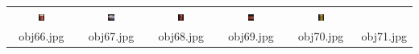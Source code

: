 \begin{table}[H]
\begin{tabu}{|cccccc|}
    \includegraphics[width=0.1\textwidth,height=0.1\textwidth]{imagens/coil_100/embalagens_cilindricas/obj71__0.png} &
    \includegraphics[width=0.1\textwidth,height=0.1\textwidth]{imagens/coil_100/embalagens_cilindricas/obj87__0.png} &
    \includegraphics[width=0.1\textwidth,height=0.1\textwidth]{imagens/coil_100/embalagens_cilindricas/obj93__0.png} &
    \includegraphics[width=0.1\textwidth,height=0.1\textwidth]{imagens/coil_100/embalagens_cilindricas/obj93__0_1.png} &
    \includegraphics[width=0.1\textwidth,height=0.1\textwidth]{imagens/coil_100/embalagens_cilindricas/obj99__0.png}
    \\
    \scriptsize{obj66.jpg} & \scriptsize{obj67.jpg} & \scriptsize{obj68.jpg} &
    \scriptsize{obj69.jpg} & \scriptsize{obj70.jpg} & \scriptsize{obj71.jpg}
  \end{tabu}
\end{table}

